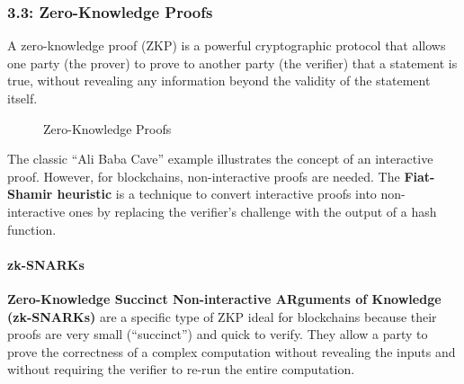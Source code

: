 
\subsubsection{3.3: Zero-Knowledge Proofs}\label{zero-knowledge-proofs}

A zero-knowledge proof (ZKP) is a powerful cryptographic protocol that
allows one party (the prover) to prove to another party (the verifier)
that a statement is true, without revealing any information beyond the
validity of the statement itself.

\begin{figure}
\centering
\caption{Zero-Knowledge Proofs}
\end{figure}

The classic ``Ali Baba Cave'' example illustrates the concept of an
interactive proof. However, for blockchains, non-interactive proofs are
needed. The \textbf{Fiat-Shamir heuristic} is a technique to convert
interactive proofs into non-interactive ones by replacing the verifier's
challenge with the output of a hash function.


\paragraph{zk-SNARKs}\label{zk-snarks}

\textbf{Zero-Knowledge Succinct Non-interactive ARguments of Knowledge
(zk-SNARKs)} are a specific type of ZKP ideal for blockchains because
their proofs are very small (``succinct'') and quick to verify. They
allow a party to prove the correctness of a complex computation without
revealing the inputs and without requiring the verifier to re-run the
entire computation.

